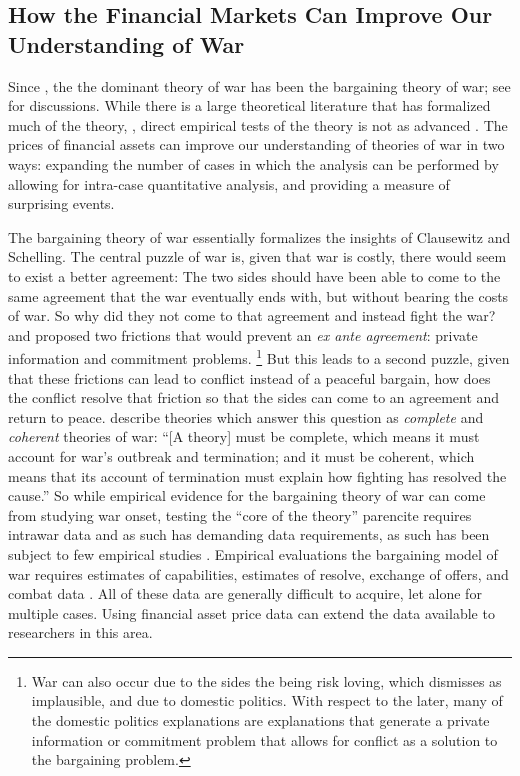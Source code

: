 \subsection{How the Financial Markets Can Improve Our Understanding of War}
\label{sec:how-prices-financial-1}

Since \parencite{Fearon1995}, the the dominant theory of war has been the bargaining theory of war; see \textcites{Reiter2003}{Powell2006}{Reiter2009} for discussions.%
While there is a large theoretical literature that has formalized much of the theory, \parencites{FilsonWerner2002}{Slantchev2003}{SmithStam2004}{Powell2004}{LeventogluSlantchev2007}{LangloisLanglois2009}{WolfordReiterCarrubba2011}, direct empirical tests of the theory is not as advanced \parencite{Reiter2009}.
The prices of financial assets can improve our understanding of theories of war in two ways: expanding the number of cases in which the analysis can be performed by allowing for intra-case quantitative analysis, and providing a measure of surprising events.

The bargaining theory of war essentially formalizes the insights of Clausewitz and Schelling.
The central puzzle of war is, given that war is costly, there would seem to exist a better agreement:
The two sides should have been able to come to the same agreement that the war eventually ends with, but without bearing the costs of war.
So why did they not come to that agreement and instead fight the war?
\parencite{Fearon1995} and \parencite{Powell2006} proposed two frictions that would prevent an \textit{ex ante agreement}: private information and commitment problems.%
\footnote{
  War can also occur due to the sides the being risk loving, which \textcite{Fearon1995} dismisses as implausible, and due to domestic politics.
  With respect to the later, many of the domestic politics explanations are explanations that generate a private information or commitment problem that allows for conflict as a solution to the bargaining problem.
}
But this leads to a second puzzle, given that these frictions can lead to conflict instead of a peaceful bargain, how does the conflict resolve that friction so that the sides can come to an agreement and return to peace.
\textcite[757]{LeventogluSlantchev2007} describe theories which answer this question as \textit{complete} and \textit{coherent} theories of war: ``[A theory] must be complete, which means it must account for war’s outbreak and termination; and it must be coherent, which means that its account of termination must explain how fighting has resolved the cause.''
So while empirical evidence for the bargaining theory of war can come from studying war onset, testing the ``core of the theory'' parencite requires intrawar data and as such has demanding data requirements, as such has been subject to few empirical studies \parencites{Reiter2003}{Ramsay2008}{Reiter2009}{Weisiger2015}.
Empirical evaluations the bargaining model of war requires estimates of capabilities, estimates of resolve, exchange of offers, and combat data \parencite{Reiter2003}.
All of these data are generally difficult to acquire, let alone for multiple cases.
Using financial asset price data can extend the data available to researchers in this area.

